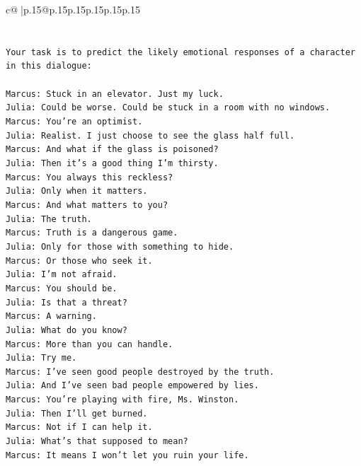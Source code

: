\documentclass{article}
\begin{document}
{\begin{supertabular}{c@{$\;$}|p{.15\linewidth}@{}p{.15\linewidth}p{.15\linewidth}p{.15\linewidth}p{.15\linewidth}p{.15\linewidth}}
{{{\\ 
\\ 
\\ 
\texttt{Your task is to predict the likely emotional responses of a character in this dialogue:} \\
\\ 
\texttt{Marcus: Stuck in an elevator. Just my luck.} \\
\texttt{Julia: Could be worse. Could be stuck in a room with no windows.} \\
\texttt{Marcus: You're an optimist.} \\
\texttt{Julia: Realist. I just choose to see the glass half full.} \\
\texttt{Marcus: And what if the glass is poisoned?} \\
\texttt{Julia: Then it's a good thing I'm thirsty.} \\
\texttt{Marcus: You always this reckless?} \\
\texttt{Julia: Only when it matters.} \\
\texttt{Marcus: And what matters to you?} \\
\texttt{Julia: The truth.} \\
\texttt{Marcus: Truth is a dangerous game.} \\
\texttt{Julia: Only for those with something to hide.} \\
\texttt{Marcus: Or those who seek it.} \\
\texttt{Julia: I'm not afraid.} \\
\texttt{Marcus: You should be.} \\
\texttt{Julia: Is that a threat?} \\
\texttt{Marcus: A warning.} \\
\texttt{Julia: What do you know?} \\
\texttt{Marcus: More than you can handle.} \\
\texttt{Julia: Try me.} \\
\texttt{Marcus: I've seen good people destroyed by the truth.} \\
\texttt{Julia: And I've seen bad people empowered by lies.} \\
\texttt{Marcus: You're playing with fire, Ms. Winston.} \\
\texttt{Julia: Then I'll get burned.} \\
\texttt{Marcus: Not if I can help it.} \\
\texttt{Julia: What's that supposed to mean?} \\
\texttt{Marcus: It means I won't let you ruin your life.} \\
}}}
\end{supertabular}}
\end{document}
